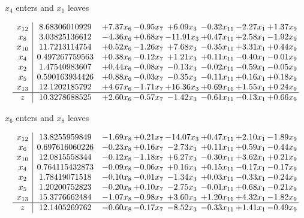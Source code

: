 \documentclass[8pt]{article}
\begin{document}
 $ x_{4} $ enters and $ x_{1} $ leaves 

 \[\begin{array}{c| c c@{\hskip 2pt} c@{\hskip 2pt} c@{\hskip 2pt} c@{\hskip 2pt} c@{\hskip 2pt} c@{\hskip 2pt} }
 x_{12}   &  8.68306010929 & +  7.37 x_{6} & -0.95 x_{7} & +  6.09 x_{3} & -0.32 x_{11} & -2.27 x_{1} & +  1.37 x_{9}\\
 x_{8}   &  3.03825136612 & -4.36 x_{6} & +  0.68 x_{7} & -11.91 x_{3} & +  0.47 x_{11} & +  2.58 x_{1} & -1.92 x_{9}\\
 x_{10}   &  11.7213114754 & +  0.52 x_{6} & -1.26 x_{7} & +  7.68 x_{3} & -0.35 x_{11} & +  3.31 x_{1} & +  0.44 x_{9}\\
 x_{4}   &  0.497267759563 & +  0.38 x_{6} & -0.12 x_{7} & +  1.21 x_{3} & +  0.11 x_{11} & -0.40 x_{1} & -0.01 x_{9}\\
 x_{2}   &  1.47540983607 & +  0.44 x_{6} & -0.08 x_{7} & -0.13 x_{3} & -0.02 x_{11} & -0.59 x_{1} & -0.05 x_{9}\\
 x_{5}   &  0.590163934426 & +  0.88 x_{6} & -0.03 x_{7} & -0.35 x_{3} & -0.11 x_{11} & +  0.16 x_{1} & +  0.18 x_{9}\\
 x_{13}   &  12.1202185792 & +  4.67 x_{6} & -1.71 x_{7} & + 16.36 x_{3} & +  0.69 x_{11} & +  1.55 x_{1} & +  0.24 x_{9}\\
\hline
z    &  10.3278688525 & +  2.60 x_{6} & -0.57 x_{7} & -1.42 x_{3} & -0.61 x_{11} & -0.13 x_{1} & +  0.66 x_{9}\\
\end{array}\]


 $ x_{6} $ enters and $ x_{8} $ leaves 

 \[\begin{array}{c| c c@{\hskip 2pt} c@{\hskip 2pt} c@{\hskip 2pt} c@{\hskip 2pt} c@{\hskip 2pt} c@{\hskip 2pt} }
 x_{12}   &  13.8255959849 & -1.69 x_{8} & +  0.21 x_{7} & -14.07 x_{3} & +  0.47 x_{11} & +  2.10 x_{1} & -1.89 x_{9}\\
 x_{6}   &  0.697616060226 & -0.23 x_{8} & +  0.16 x_{7} & -2.73 x_{3} & +  0.11 x_{11} & +  0.59 x_{1} & -0.44 x_{9}\\
 x_{10}   &  12.0815558344 & -0.12 x_{8} & -1.18 x_{7} & +  6.27 x_{3} & -0.30 x_{11} & +  3.62 x_{1} & +  0.21 x_{9}\\
 x_{4}   &  0.764115432873 & -0.09 x_{8} & -0.06 x_{7} & +  0.16 x_{3} & +  0.15 x_{11} & -0.17 x_{1} & -0.17 x_{9}\\
 x_{2}   &  1.78419071518 & -0.10 x_{8} & -0.01 x_{7} & -1.34 x_{3} & +  0.03 x_{11} & -0.33 x_{1} & -0.24 x_{9}\\
 x_{5}   &  1.20200752823 & -0.20 x_{8} & +  0.10 x_{7} & -2.75 x_{3} & -0.01 x_{11} & +  0.68 x_{1} & -0.21 x_{9}\\
 x_{13}   &  15.3776662484 & -1.07 x_{8} & -0.98 x_{7} & +  3.60 x_{3} & +  1.20 x_{11} & +  4.32 x_{1} & -1.82 x_{9}\\
\hline
z    &  12.1405269762 & -0.60 x_{8} & -0.17 x_{7} & -8.52 x_{3} & -0.33 x_{11} & +  1.41 x_{1} & -0.49 x_{9}\\
\end{array}\]
\end{document}
